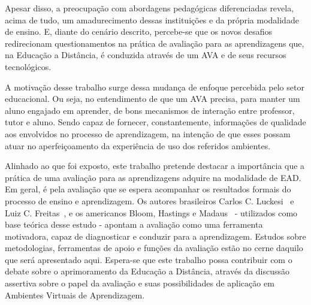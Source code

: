 
Apesar disso, a preocupação com abordagens pedagógicas diferenciadas revela, acima de tudo, um amadurecimento dessas instituições e da própria modalidade de ensino. E, diante do cenário descrito, percebe-se que os novos desafios redirecionam questionamentos na prática de avaliação para as aprendizagens que, na Educação a Distância, é conduzida através de um \acrfull{AVA} e de seus recursos tecnológicos. 

A motivação desse trabalho surge dessa mudança de enfoque percebida pelo setor educacional. Ou seja, no entendimento de que um AVA precisa, para manter um aluno engajado em aprender, de bons mecanismos de interação entre professor, tutor e aluno. Sendo capaz de fornecer, constantemente, informações de qualidade aos envolvidos no processo de aprendizagem, na intenção de que esses possam atuar no aperfeiçoamento da experiência de uso dos referidos ambientes. 

Alinhado ao que foi exposto, este trabalho pretende destacar a importância que a prática de uma avaliação para as aprendizagens adquire na modalidade de EAD. Em geral, é pela avaliação que se espera acompanhar os resultados formais do processo de ensino e aprendizagem. Os autores brasileiros Carlos C. Luckesi~\cite{luckesi2014avaliaccao} e Luiz C. Freitas~\cite{de2003ciclos}, e os americanos Bloom, Hastings e Madaus~\cite{bloom1983manual} - utilizados como base teórica desse estudo - apontam a avaliação como uma ferramenta motivadora, capaz de diagnosticar e conduzir para a aprendizagem. Estudos sobre metodologias, ferramentas de apoio e funções da avaliação estão no cerne daquilo que será apresentado aqui. Espera-se que este trabalho possa contribuir com o debate sobre o aprimoramento da Educação a Distância, através da discussão assertiva sobre o papel da avaliação e suas possibilidades de aplicação em Ambientes Virtuais de Aprendizagem. 

